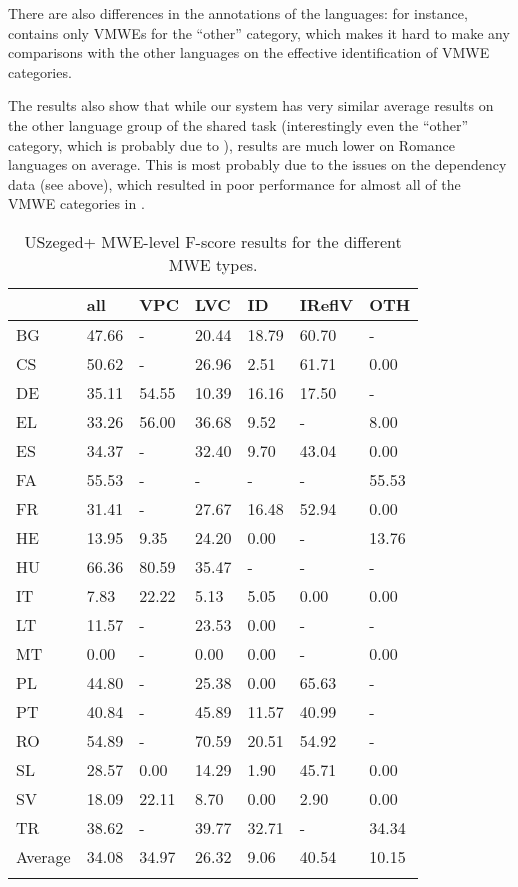 \documentclass[output=paper,modfonts]{langscibook}
\begin{document}
There are also differences in the annotations of the languages: for instance,  contains only VMWEs for the ``other'' category, which makes it hard to make any comparisons with the other languages on the effective identification of VMWE categories.

The results also show that while our system has very similar average results on the other language group of the shared task (interestingly even the ``other'' category, which is probably due to ), results are much lower on Romance languages on average. This is most probably due to the issues on the  dependency data (see above), which resulted in poor performance for almost all of the VMWE categories in .


\begin{table}
\centering
\caption{USzeged+ MWE-level F-score results for the different MWE types.}
\label{mwelevel}
\begin{tabular}{lllllll}
  \lsptoprule
 & all   & VPC    & LVC    & ID     & IReflV & OTH    \\
 \midrule
BG  & 47.66 &  -       & 20.44 & 18.79 & 60.70 &  -   \\
CS  & 50.62 &  -       & 26.96 & 2.51 & 61.71 & 0.00\\
DE  & 35.11 & 54.55 & 10.39 & 16.16 & 17.50 &  -   \\
EL  & 33.26 & 56.00 & 36.68 & 9.52 &  -       & 8.00\\
ES  & 34.37 &  -       & 32.40 & 9.70 & 43.04 & 0.00\\
FA  & 55.53 &  -       &  -       &  -       &  -       & 55.53 \\
FR  & 31.41 &  -       & 27.67 & 16.48 & 52.94 & 0.00\\
HE  & 13.95 & 9.35 & 24.20 & 0.00 &  -       & 13.76 \\
HU  & 66.36 & 80.59 & 35.47 &  -       &  -       &  -   \\
IT  & 7.83 & 22.22 & 5.13 & 5.05 & 0.00 & 0.00\\
LT  & 11.57 &  -       & 23.53 & 0.00 &  -       &  -   \\
MT  & 0.00 &  -       & 0.00 & 0.00 &  -       & 0.00\\
PL  & 44.80 &  -       & 25.38 & 0.00 & 65.63 &  -   \\
PT  & 40.84 &  -       & 45.89 & 11.57 & 40.99 &  -   \\
RO  & 54.89 &  -       & 70.59 & 20.51 & 54.92 &  -   \\
SL  & 28.57 & 0.00 & 14.29 & 1.90 & 45.71 & 0.00\\
SV  & 18.09 & 22.11 & 8.70 & 0.00 & 2.90 & 0.00\\
TR  & 38.62 &  -       & 39.77 & 32.71 &  -       & 34.34 \\
 \midrule
Average  & 34.08 & 34.97 & 26.32 & 9.06 & 40.54 & 10.15 \\


  \lspbottomrule
\end{tabular}
\end{table}
\end{document}
